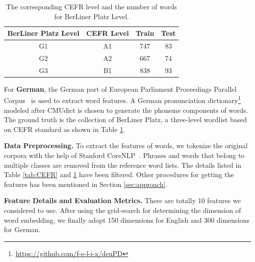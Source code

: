 \begin{table}[]
	\begin{center}
		\scriptsize
		\begin{tabular}{|c|c|c|c|}
			\hline
			\textbf{BerLiner Platz Level}&\textbf{CEFR Level}& \textbf{Train} & \textbf{Test}\\
			\hline
			G1 & A1 & 747 & 83\\
			\hline
			G2 &A2& 667 & 74\\
			\hline
			G3&B1& 838 & 93\\
			\hline
		\end{tabular}
	\end{center}
	\vspace{-0.45cm}
	\caption{\label{tab:German} The corresponding CEFR level and the number of words for BerLiner Platz Level.}
\end{table}

For \textbf{German}, the German part of European Parliament Proceedings Parallel Corpus~\cite{koehn2005europarl} is used to extract word features.
A German pronunciation dictionary\footnote{\url{https://github.com/f-e-l-i-x/deuPD}} modeled after CMUdict 
is chosen to generate the phoneme components of words.
The ground truth is the collection of BerLiner Platz, a three-level wordlist based on CEFR standard as shown in Table \ref{tab:German}. 

\textbf{Data Preprocessing.} To extract the features of words, we tokenize the original corpora with the help of Stanford CoreNLP~\cite{manning-EtAl:2014:P14-5}.
Phrases and words that belong to multiple classes are removed from
the reference word lists. The details listed in Table \ref{tab:CEFR} and \ref{tab:German} have been filtered. 
Other procedures for getting the features has been mentioned in Section \ref{sec:approach}.

\textbf{Feature Details and Evaluation Metrics.} 
There are totally 10 features we considered to use.
After using the grid-search for determining the dimension of word embedding, we finally adopt 150 dimensions for English and 300 dimensions for German.

